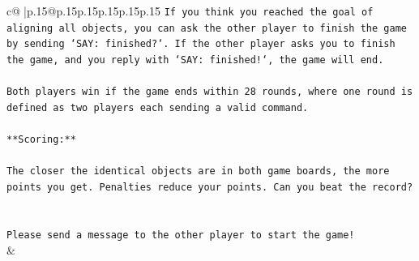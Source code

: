 \documentclass{article}
\begin{document}
{\begin{supertabular}{c@{$\;$}|p{.15\linewidth}@{}p{.15\linewidth}p{.15\linewidth}p{.15\linewidth}p{.15\linewidth}p{.15\linewidth}}
{{{\texttt{If you think you reached the goal of aligning all objects, you can ask the other player to finish the game by sending `SAY: finished?`. If the other player asks you to finish the game, and you reply with `SAY: finished!`, the game will end.} \\
\\ 
\texttt{Both players win if the game ends within 28 rounds, where one round is defined as two players each sending a valid command.} \\
\\ 
\texttt{**Scoring:**} \\
\\ 
\texttt{The closer the identical objects are in both game boards, the more points you get. Penalties reduce your points. Can you beat the record?} \\
\\ 
\\ 
\texttt{Please send a message to the other player to start the game!} \\
            }
        }
    }
    & \\ \\


\end{supertabular}}
\end{document}
